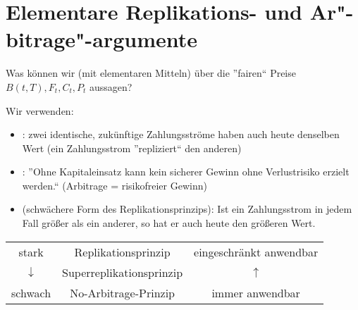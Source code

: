 \section{Elementare Replikations- und Ar"-bitrage"-argumente}

Was können wir (mit elementaren Mitteln) über die ''fairen`` Preise $B(t,T), F_t, C_t, P_t$ aussagen?

Wir verwenden:

\begin{itemize}[topsep=-\parskip]
	\item {}: zwei identische, zukünftige Zahlungsströme haben auch heute denselben Wert (ein Zahlungsstrom ''repliziert`` den anderen)
	\item {}: ''Ohne Kapitaleinsatz kann kein sicherer Gewinn ohne Verlustrisiko erzielt werden.`` (Arbitrage = risikofreier Gewinn)
	\item {} (schwächere Form des Replikationsprinzips): Ist ein Zahlungsstrom in jedem Fall größer als ein anderer, so hat er auch heute den größeren Wert.
\end{itemize}

\begin{center}
	\begin{tabular}{|c|c|c|}
		\hline
		stark & Replikationsprinzip & eingeschränkt anwendbar \\
		$\downarrow$ & Superreplikationsprinzip & $\uparrow$ \\
		schwach & No-Arbitrage-Prinzip & immer anwendbar \\
		\hline
	\end{tabular}
\end{center}

